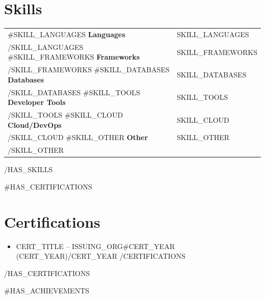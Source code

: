 \documentclass[10pt, a4paper]{article}
\newcommand{\hskills}[1]{{\bfseries #1} }
\begin{document}
\section{Skills}

\begin{tabular}{p{11em} p{44em}}
{{#SKILL_LANGUAGES}} \hskills{Languages} & {{SKILL_LANGUAGES}} \\ {{/SKILL_LANGUAGES}}
{{#SKILL_FRAMEWORKS}} \hskills{Frameworks} & {{SKILL_FRAMEWORKS}} \\ {{/SKILL_FRAMEWORKS}}
{{#SKILL_DATABASES}} \hskills{Databases} & {{SKILL_DATABASES}} \\ {{/SKILL_DATABASES}}
{{#SKILL_TOOLS}} \hskills{Developer Tools} & {{SKILL_TOOLS}} \\ {{/SKILL_TOOLS}}
{{#SKILL_CLOUD}} \hskills{Cloud/DevOps} & {{SKILL_CLOUD}} \\ {{/SKILL_CLOUD}}
{{#SKILL_OTHER}} \hskills{Other} & {{SKILL_OTHER}} \\ {{/SKILL_OTHER}}
\end{tabular}
\vspace{-0.2cm}
{{/HAS_SKILLS}}

{{#HAS_CERTIFICATIONS}}
\section{Certifications}
\begin{itemize}[itemsep=0pt, parsep=1pt, leftmargin=1em]
{{#CERTIFICATIONS}}
  \item {{CERT_TITLE}} -- {{ISSUING_ORG}}{{#CERT_YEAR}} ({{CERT_YEAR}}){{/CERT_YEAR}}
{{/CERTIFICATIONS}}
\end{itemize}
\vspace{-0.2cm}
{{/HAS_CERTIFICATIONS}}

{{#HAS_ACHIEVEMENTS}}
\end{document}
